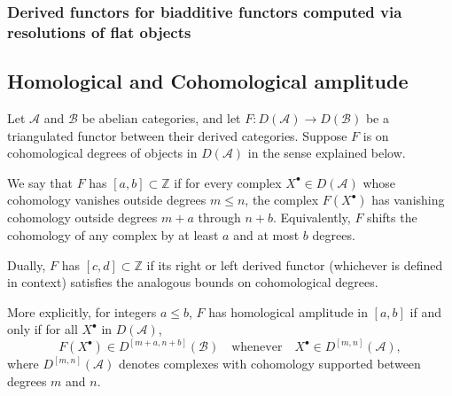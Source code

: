 \subsubsection{Derived functors for biadditive functors computed via resolutions of flat objects} \label{subsubsection:derived_functors_for_biadditive_functors_computed_via_resolutions_of_flat_objects}





\subsection{Homological and Cohomological amplitude}

\begin{definition}
    \TODO{}
Let $\mathcal{A}$ and $\mathcal{B}$ be abelian categories, and let $F \colon D(\mathcal{A}) \to D(\mathcal{B})$ be a triangulated functor between their derived categories. Suppose $F$ is  on cohomological degrees of objects in $D(\mathcal{A})$ in the sense explained below.

\medskip

We say that $F$ has  $[a,b] \subset \mathbb{Z}$ if for every complex $X^\bullet \in D(\mathcal{A})$ whose cohomology vanishes outside degrees $m \leq n$, the complex $F(X^\bullet)$ has vanishing cohomology outside degrees $m+a$ through $n+b$. Equivalently, $F$ shifts the cohomology of any complex by at least $a$ and at most $b$ degrees.

\medskip

Dually, $F$ has  $[c,d] \subset \mathbb{Z}$ if its right or left derived functor (whichever is defined in context) satisfies the analogous bounds on cohomological degrees.

\medskip

More explicitly, for integers $a \leq b$, $F$ has homological amplitude in $[a,b]$ if and only if for all $X^\bullet$ in $D(\mathcal{A})$,
$$
F(X^\bullet) \in D^{[m+a, n+b]}(\mathcal{B}) \quad \text{whenever} \quad X^\bullet \in D^{[m,n]}(\mathcal{A}),
$$
where $D^{[m,n]}(\mathcal{A})$ denotes complexes with cohomology supported between degrees $m$ and $n$.
\end{definition}


